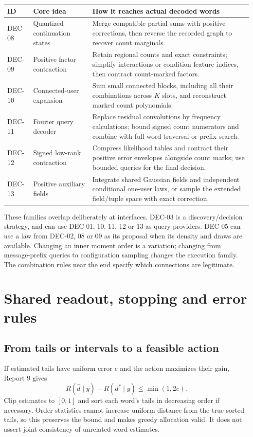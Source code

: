 \documentclass[10pt,a4paper]{article}
\begin{document}
\begin{center}\small
\begin{tabularx}{\textwidth}{@{}p{}p{}Y@{}}\toprule
ID & Core idea & How it reaches actual decoded words\\\midrule
DEC-08 & Quantized continuation states & Merge compatible partial sums with positive corrections, then reverse the recorded graph to recover count marginals.\\
DEC-09 & Positive factor contraction & Retain regional counts and exact constraints; simplify interactions or condition feature indices, then contract count-marked factors.\\
DEC-10 & Connected-user expansion & Sum small connected blocks, including all their combinations across $K$ slots, and reconstruct marked count polynomials.\\
DEC-11 & Fourier query decoder & Replace residual convolutions by frequency calculations; bound signed count numerators and combine with full-word traversal or prefix search.\\
DEC-12 & Signed low-rank contraction & Compress likelihood tables and contract their positive error envelopes alongside count marks; use bounded queries for the final decision.\\
DEC-13 & Positive auxiliary fields & Integrate shared Gaussian fields and independent conditional one-user laws, or sample the extended field/tuple space with exact correction.\\\bottomrule
\end{tabularx}
\end{center}

These families overlap deliberately at interfaces. DEC-03 is a discovery/decision strategy, and can
use DEC-01, 10, 11, 12 or 13 as query providers. DEC-05 can use a law from DEC-02, 08 or 09 as its
proposal when its density and draws are available. Changing an inner moment order is a variation;
changing from message-prefix queries to configuration sampling changes the execution family.
The combination rules near the end specify which connections are legitimate.

\section{Shared readout, stopping and error rules}
\label{sec:interfaces}
\subsection{From tails or intervals to a feasible action}
If estimated tails have uniform error $e$ and the action maximizes their gain, Report 9 gives
\begin{equation}
 R(\widehat d\mid y)-R(d^*\mid y)\leq\min(1,2e).
 \label{eq:decision}
\end{equation}
Clip estimates to $[0,1]$ and sort each word's tails in decreasing order if necessary.
Order statistics cannot increase uniform distance from the true sorted tails, so this preserves the
bound and makes greedy allocation valid. It does not assert joint consistency of unrelated word estimates.
\end{document}
